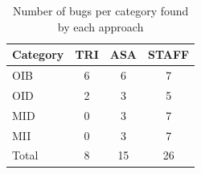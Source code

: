 \begin{table}[ht]
\centering
\renewcommand{\arraystretch}{1.1}
\begin{tabular}{|l||c|c|c|}
\hline
{\sc Category} & {\sc TRI} & {\sc ASA} & {\sc STAFF} \\
\hline\hline
OIB & 6 & 6 & 7 \\
OID & 2 & 3 & 5 \\
MID & 0 & 3 & 7 \\
MII & 0 & 3 & 7 \\
\hline
Total & 8 & 15 & 26 \\
\hline
\end{tabular}
\caption{Number of bugs per category found by each approach}
\label{tab:bugs_per_category_by_approach}
\end{table}
